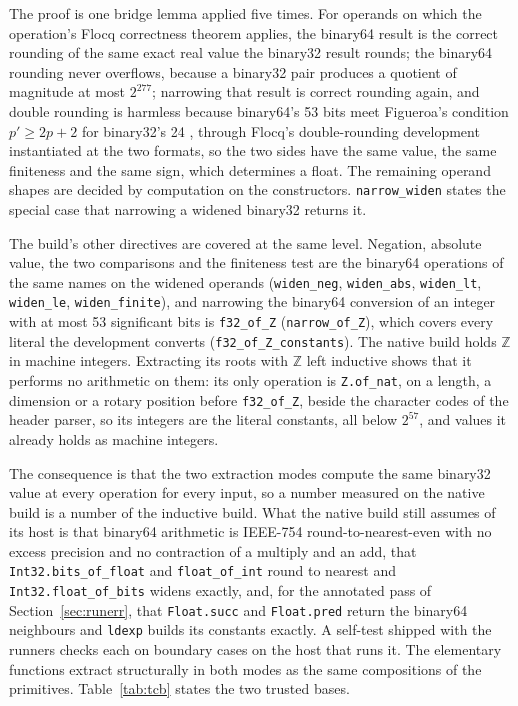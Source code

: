 \documentclass[11pt]{article}
\theoremstyle{plain}
\theoremstyle{definition}
\newcommand{\code}[1]{\texttt{#1}}
\begin{document}
The proof is one bridge lemma applied five times. For operands on which the
operation's Flocq correctness theorem applies, the binary64 result is the
correct rounding of the same exact real value the binary32 result rounds; the
binary64 rounding never overflows, because a binary32 pair produces a quotient
of magnitude at most $2^{277}$; narrowing that result is correct rounding
again, and double rounding is harmless because binary64's 53 bits meet
Figueroa's condition $p' \ge 2p + 2$ for binary32's 24 \cite{figueroa1995},
through Flocq's double-rounding development \cite{roux2014} instantiated at the
two formats, so the two sides
have the same value, the same finiteness and the same sign, which determines a
float. The remaining operand shapes are decided by computation on the
constructors. \code{narrow\_widen} states the special case that narrowing a
widened binary32 returns it.

The build's other directives are covered at the same level. Negation, absolute
value, the two comparisons and the finiteness test are the binary64 operations
of the same names on the widened operands (\code{widen\_neg},
\code{widen\_abs}, \code{widen\_lt}, \code{widen\_le}, \code{widen\_finite}),
and narrowing the binary64 conversion of an integer with at most 53
significant bits is \code{f32\_of\_Z} (\code{narrow\_of\_Z}), which covers every
literal the development converts (\code{f32\_of\_Z\_constants}). The native
build holds $\mathbb{Z}$ in machine integers. Extracting its roots with
$\mathbb{Z}$ left inductive shows that it performs no arithmetic on them: its
only operation is \code{Z.of\_nat}, on a length, a dimension or a rotary
position before \code{f32\_of\_Z}, beside the character codes of the header
parser, so its integers are the literal constants, all below $2^{57}$, and
values it already holds as machine integers.

The consequence is that the two extraction modes compute the same binary32
value at every operation for every input, so a number measured on the native
build is a number of the inductive build. What the native build still assumes
of its host is that binary64 arithmetic is IEEE-754 round-to-nearest-even with
no excess precision and no contraction of a multiply and an add, that
\code{Int32.bits\_of\_float} and \code{float\_of\_int} round to nearest and
\code{Int32.float\_of\_bits} widens exactly, and, for the annotated pass of
Section~\ref{sec:runerr}, that \code{Float.succ} and \code{Float.pred} return
the binary64 neighbours and \code{ldexp} builds its constants exactly. A
self-test shipped with the runners checks each on boundary cases on the host
that runs it. The elementary functions extract structurally in both modes as
the same compositions of the primitives. Table~\ref{tab:tcb} states the two
trusted bases.
\end{document}
